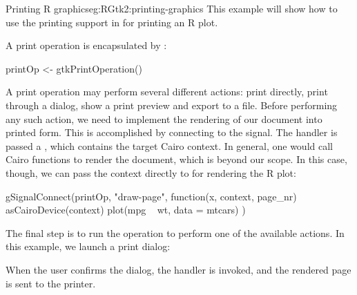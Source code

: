 \begin{example}{Printing R graphics}{eg:RGtk2:printing-graphics}
  This example will show how to use the printing support in \GTK\/ for
  printing an R plot. 
  
  A print operation is encapsulated by :
\begin{Schunk}
\begin{Sinput}
 printOp <- gtkPrintOperation()
\end{Sinput}
\end{Schunk}
%
A print operation may perform several different actions: print
directly, print through a dialog, show a print preview and export to a
file. Before performing any such action, we need to implement the
rendering of our document into printed form. This is accomplished by
connecting to the  signal. The handler is passed a
, which contains the target Cairo context. In
general, one would call Cairo functions to render the document, which
is beyond our scope. In this case, though, we can pass the context
directly to  for rendering the R plot:
\begin{Schunk}
\begin{Sinput}
 gSignalConnect(printOp, "draw-page", 
                function(x, context, page_nr) {
                  asCairoDevice(context)
                  plot(mpg ~ wt, data = mtcars)
                })
\end{Sinput}
\end{Schunk}
%
  The final step is to run the operation to perform one of the
  available actions. In this example, we launch a print dialog:
\begin{Schunk}
\end{Schunk}
% 
  When the user confirms the dialog, the
   handler is invoked, and the
  rendered page is sent to the printer.
\end{example}


